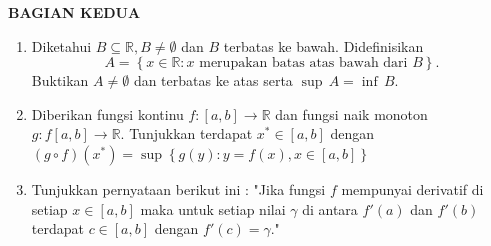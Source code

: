 \documentclass[12pt,twoside]{article}
\begin{document}
\newpage \textbf{BAGIAN KEDUA}
\begin{enumerate}
	\item Diketahui $B \subseteq \mathbb{R}, B \neq \emptyset$ dan $B$ terbatas ke bawah. Didefinisikan $$A = \left\lbrace x \in \mathbb{R} : x \text{ merupakan batas atas bawah dari }B \right\rbrace.$$
	      Buktikan $A \neq \emptyset$ dan terbatas ke atas serta $\sup \, A = \inf \,B$.

	\item Diberikan fungsi kontinu $f : [a,b] \to \mathbb{R}$ dan fungsi naik monoton $g : f[a,b] \to \mathbb{R}.$ Tunjukkan terdapat $x^* \in [a,b]$ dengan $(g \circ f)(x^*) = \sup \left\lbrace g(y) : y = f(x), x \in [a,b] \right\rbrace$

	\item Tunjukkan pernyataan berikut ini : "Jika fungsi $f$ mempunyai derivatif di setiap $x \in [a,b]$ maka untuk setiap nilai $\gamma$ di antara $f'(a)$ dan $f'(b)$ terdapat $c \in [a,b]$ dengan $f'(c)=\gamma$."

\end{enumerate}
\pagebreak
\end{document}
